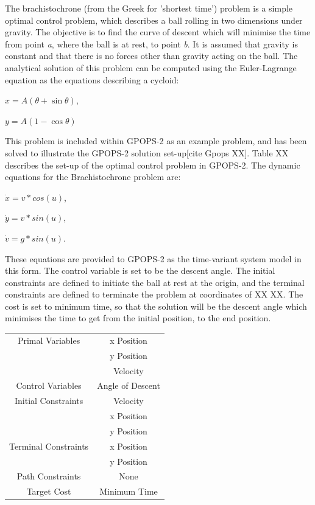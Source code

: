 The brachistochrone (from the Greek for 'shortest time') problem is a simple optimal control problem, which describes a ball rolling in two dimensions under gravity. The objective is to find the curve of descent which will minimise the time from point \textit{a}, where the ball is at rest, to point \textit{b}. It is assumed that gravity is constant and that there is no forces other than gravity acting on the ball. 
The analytical solution of this problem can be computed using the Euler-Lagrange equation as the equations describing a cycloid:

$x = A(\theta + \sin\theta) $,

$y=A(1 - \cos\theta)$

This problem is included within GPOPS-2 as an example problem, and has been solved to illustrate the GPOPS-2 solution set-up[cite Gpops XX]. Table XX describes the set-up of the optimal control problem in GPOPS-2. The dynamic equations for the Brachistochrone problem are:

$\dot{x} = v*cos(u)$,

$\dot{y} = v*sin(u)$,

$\dot{v} = g*sin(u)$.

\noindent These equations are provided to GPOPS-2 as the time-variant system model in this form. The control variable is set to be the descent angle. The initial constraints are defined to initiate the ball at rest at the origin, and the terminal constraints are defined to terminate the problem at coordinates of XX XX. The cost is set to minimum time, so that the solution will be the descent angle which minimises the time to get from the initial position, to the end position. 

\begin{table}
\centering
\begin{tabular}{|c|c|}
	\hline Primal Variables  & x Position\\& y Position\\& Velocity\\ 
	\hline Control Variables  & Angle of Descent\\ 
	\hline Initial Constraints  & Velocity\\ & x Position\\ & y Position\\
	\hline Terminal Constraints &  x Position\\ & y Position\\
	\hline Path Constraints & None \\ 
	\hline Target Cost & Minimum Time \\ 
	\hline 
\end{tabular} 
\end{table}


